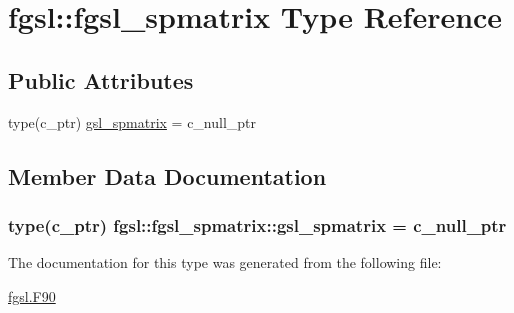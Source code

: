 \hypertarget{structfgsl_1_1fgsl__spmatrix}{}\section{fgsl\+:\+:fgsl\+\_\+spmatrix Type Reference}
\label{structfgsl_1_1fgsl__spmatrix}
\subsection*{Public Attributes}
\begin{DoxyCompactItemize}
\item 
type(c\+\_\+ptr) \hyperlink{structfgsl_1_1fgsl__spmatrix_a34a11740df265f72e225aea60a52670b}{gsl\+\_\+spmatrix} = c\+\_\+null\+\_\+ptr
\end{DoxyCompactItemize}


\subsection{Member Data Documentation}
\hypertarget{structfgsl_1_1fgsl__spmatrix_a34a11740df265f72e225aea60a52670b}{}
\subsubsection[{gsl\+\_\+spmatrix}]{\setlength{\rightskip}{0pt plus 5cm}type(c\+\_\+ptr) fgsl\+::fgsl\+\_\+spmatrix\+::gsl\+\_\+spmatrix = c\+\_\+null\+\_\+ptr}\label{structfgsl_1_1fgsl__spmatrix_a34a11740df265f72e225aea60a52670b}


The documentation for this type was generated from the following file\+:\begin{DoxyCompactItemize}
\item 
\hyperlink{fgsl_8F90}{fgsl.\+F90}\end{DoxyCompactItemize}
